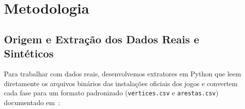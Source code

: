 \documentclass[conference]{IEEEtran}
\begin{document}
\section{Metodologia}
\label{sec:metodologia}

\subsection{Origem e Extra\c{c}\~ao dos Dados Reais e Sint\'eticos}
Para trabalhar com dados reais, desenvolvemos extratores em Python que leem diretamente os arquivos bin\'arios das instala\c{c}\~oes oficiais dos jogos e convertem cada fase para um formato padronizado (\texttt{vertices.csv} e \texttt{arestas.csv}) documentado em~\cite{dataset_zenodo}:
\end{document}
